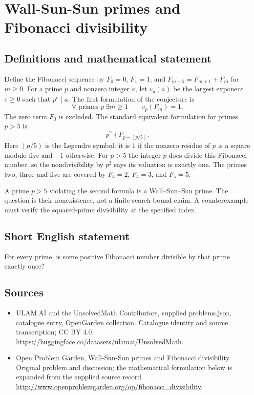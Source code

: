\documentclass[11pt,a4paper]{article}
\begin{document}
\section*{Wall-Sun-Sun primes and Fibonacci divisibility}\label{statement}

\subsection{Definitions and mathematical statement}
Define the Fibonacci sequence by $F_0=0$, $F_1=1$, and
$F_{m+2}=F_{m+1}+F_m$ for $m\ge0$. For a prime $p$ and nonzero
integer $a$, let $v_p(a)$ be the largest exponent $e\ge0$ such that
$p^e\mid a$. The first formulation of the conjecture is
\[
 \forall\text{ primes }p\ \exists m\ge1\qquad v_p(F_m)=1.
\]
The zero term $F_0$ is excluded. The standard equivalent formulation
for primes $p>5$ is
\[
                  p^2\nmid F_{p-(p/5)}.
\]
Here $(p/5)$ is the Legendre symbol: it is $1$ if the nonzero residue
of $p$ is a square modulo five and $-1$ otherwise. For $p>5$ the
integer $p$ does divide this Fibonacci number, so the nondivisibility
by $p^2$ says its valuation is exactly one. The primes two, three
and five are covered by $F_3=2$, $F_4=3$, and $F_5=5$.

A prime $p>5$ violating the second formula is a Wall--Sun--Sun
prime. The question is their nonexistence, not a finite search-bound
claim. A counterexample must verify the squared-prime divisibility
at the specified index.
\subsection{Short English statement}
For every prime, is some positive Fibonacci number divisible by that prime exactly once?
\subsection{Sources}
\begin{itemize}
\item[S1] ULAM.AI and the UnsolvedMath Contributors, supplied problems.json, catalogue entry, OpenGarden collection. Catalogue identity and source transcription; CC BY 4.0.
\url{https://huggingface.co/datasets/ulamai/UnsolvedMath}.
\item[S2] Open Problem Garden, Wall-Sun-Sun primes and Fibonacci divisibility. Original problem and discussion; the mathematical formulation below is expanded from the supplied source record.
\url{http://www.openproblemgarden.org/op/fibonacci_divisibility}.
\end{itemize}
\end{document}

